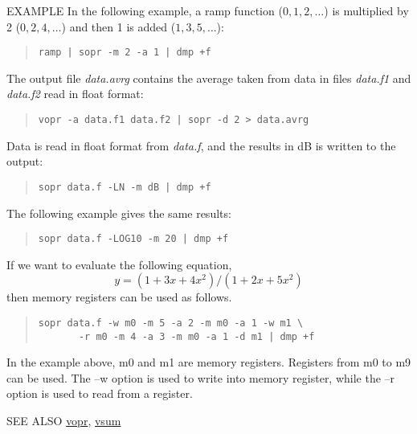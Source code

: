 \begin{qsection}{EXAMPLE}
In the following example, a ramp function ($0,1,2,\ldots$)
is multiplied by 2 ($0,2,4,\ldots$)
and then 1 is added ($1,3,5,\ldots$):
\begin{quote}
  \verb!ramp | sopr -m 2 -a 1 | dmp +f!
\end{quote}
\par
The output file {\em data.avrg} contains the average taken from
data in files {\em data.f1} and {\em data.f2} read in float format:
\begin{quote}
  \verb!vopr -a data.f1 data.f2 | sopr -d 2 > data.avrg!
\end{quote}
\par
Data is read in float format from {\em data.f},
and the results in dB is written to the output:
\begin{quote}
  \verb!sopr data.f -LN -m dB | dmp +f!
\end{quote}
The following example gives the same results:
\begin{quote}
  \verb!sopr data.f -LOG10 -m 20 | dmp +f!
\end{quote}
\par
If we want to evaluate the following equation,
\[
y = (1 + 3x + 4x^2) / (1 + 2x + 5x^2) 
\]
then memory registers can be used as follows.
\begin{quote}
\verb!sopr data.f -w m0 -m 5 -a 2 -m m0 -a 1 -w m1 \!\\
\verb!       -r m0 -m 4 -a 3 -m m0 -a 1 -d m1 | dmp +f!
\end{quote}
In the example above, m0 and m1 are memory registers.
Registers from m0 to m9 can be used.
The --w option is used to write into memory register,
while the --r option is used to read from a register.
\end{qsection}

\begin{qsection}{SEE ALSO}
\hyperlink{vopr}{vopr},
\hyperlink{vsum}{vsum}
\end{qsection}
